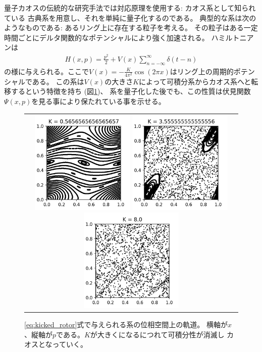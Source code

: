量子カオスの伝統的な研究手法では対応原理を使用する: カオス系として知られている
古典系を用意し、それを単純に量子化するのである。
典型的な系は次のようなものである\cite{ullmo}: あるリング上に存在する粒子を考える。
その粒子はある一定時間ごとにデルタ関数的なポテンシャルにより強く加速される。
ハミルトニアンは
\begin{align}
	H(x, p) = \frac{p^2}{2} + V(x)\sum_{n=-\infty}^{\infty}\delta(t-n)
	\label{eq:kicked_rotor}
\end{align}
の様に与えられる。ここで$V(x) = -\frac{K}{4\pi^2}\cos(2\pi x)$はリング上の周期的ポテンシャルである。
この系は$V(x)$の大きさ$K$によって可積分系からカオス系へと転移するという特徴を持ち
(図\ref{fig:phase_space_of_kicked_rotor})、
系を量子化した後でも、この性質は伏見関数$\Psi(x, p)$を見る事により保たれている事を示せる。
\begin{figure}[ht]
	\centering
	\begin{tabular}{c}
		\begin{minipage}{0.33\hsize}
			\centering
			\includegraphics[width=5cm]{figures/figure7}
		\end{minipage}
		\begin{minipage}{0.33\hsize}
			\centering
			\includegraphics[width=5cm]{figures/figure44}
		\end{minipage}
		\begin{minipage}{0.33\hsize}
			\centering
			\includegraphics[width=5cm]{figures/figure99}
		\end{minipage}
	\end{tabular}
	\caption{\eqref{eq:kicked_rotor}式で与えられる系の位相空間上の軌道。
		横軸が$x$、縦軸が$p$である。$K$が大きくになるにつれて可積分性が消滅し
		カオスとなっていく。}
	\label{fig:phase_space_of_kicked_rotor}
\end{figure}

\pagebreak